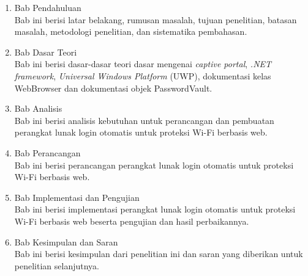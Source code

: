 \begin{enumerate}
    \item{Bab Pendahuluan \\ Bab ini berisi latar belakang, rumusan masalah, tujuan penelitian, batasan masalah, metodologi penelitian, dan sistematika pembahasan.}
    \item{Bab Dasar Teori \\ Bab ini berisi dasar-dasar teori dasar mengenai \textit{captive portal}, \textit{.NET framework}, \textit{Universal Windows Platform} (UWP), dokumentasi kelas WebBrowser dan dokumentasi objek PasswordVault.}
    \item{Bab Analisis \\ Bab ini berisi analisis kebutuhan untuk perancangan dan pembuatan perangkat lunak login otomatis untuk proteksi Wi-Fi berbasis web.}
    \item{Bab Perancangan \\ Bab ini berisi perancangan perangkat lunak login otomatis untuk proteksi Wi-Fi berbasis web.}
    \item{Bab Implementasi dan Pengujian \\ Bab ini berisi implementasi perangkat lunak login otomatis untuk proteksi Wi-Fi berbasis web beserta pengujian dan hasil perbaikannya.}
    \item{Bab Kesimpulan dan Saran \\ Bab ini berisi kesimpulan dari penelitian ini dan saran yang diberikan untuk penelitian selanjutnya.}
\end{enumerate}
